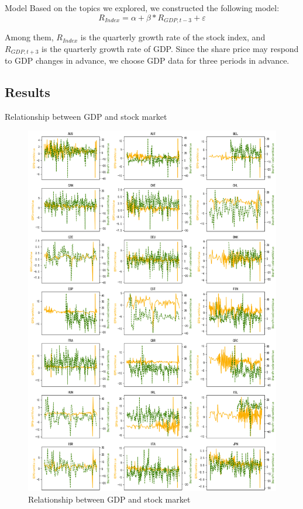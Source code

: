\documentclass[10pt]{beamer}
\begin{document}
\begin{frame}{Model}
Based on the topics we explored, we constructed the following model:
  \begin{equation*}
    R_{Index} = \alpha + \beta * R_{GDP,t-3} + \varepsilon
  \end{equation*}

  Among them, $R_{Index}$ is the quarterly growth rate of the stock index, and $R_{GDP,t+3}$ is the quarterly growth rate of GDP. Since the share price may respond to GDP changes in advance, we choose GDP data for three periods in advance.
\end{frame}


\subsection{Results}

\begin{frame}{Relationship between GDP and stock market}
    \begin{figure}[htp]
    \centering
    \includegraphics[scale=0.2]{"OECD1"}
    \caption{Relationship between GDP and stock market}
    \label{OECD Lines 1}
    \end{figure}
\end{frame}
\end{document}
